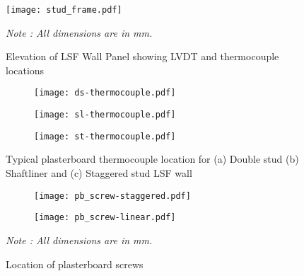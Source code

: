 \begin{figure}[!htbp]
	\centering
		\texttt{[image: stud\_frame.pdf]}
		\caption{Elevation of LSF Wall Panel showing LVDT and thermocouple locations}
		\label{fig:ds-elevation}
		\fontsize{10}{1}\textit{Note : All dimensions are in mm.}
\end{figure}
\begin{figure}[!htbp]
	\centering
	\begin{subfigure}[b]{0.5\textwidth}
		\centering
		\texttt{[image: ds-thermocouple.pdf]}
		\caption{}
		\label{subfig:ds-section}
	\end{subfigure}
	\begin{subfigure}[b]{0.5\textwidth}
		\centering
		\texttt{[image: sl-thermocouple.pdf]}
		\caption{}
		\label{subfig:sl-section}
	\end{subfigure}
	\begin{subfigure}[b]{0.6\textwidth}
		\centering
		\texttt{[image: st-thermocouple.pdf]}
		\caption{}
		\label{subfig:st-section}
	\end{subfigure}
	   \caption{Typical plasterboard thermocouple location for (a) Double stud (b) Shaftliner and (c) Staggered stud LSF wall}
	   \label{fig:typical-thermocouple}
\end{figure}
\begin{figure}[!htbp]
	\centering
	\begin{subfigure}[b]{0.3\textwidth}
		\centering
		\texttt{[image: pb\_screw-staggered.pdf]}
		\caption{}
		\label{subfig:pb_screw-staggered}
	\end{subfigure}
	\begin{subfigure}[b]{0.3\textwidth}
		\centering
		\texttt{[image: pb\_screw-linear.pdf]}
		\caption{}
		\label{subfig:pb_screw-linear}
	\end{subfigure}
	   \caption{Location of plasterboard screws}
	   \label{fig:screw}
	   \fontsize{10}{1}\textit{Note : All dimensions are in mm.}
\end{figure}

